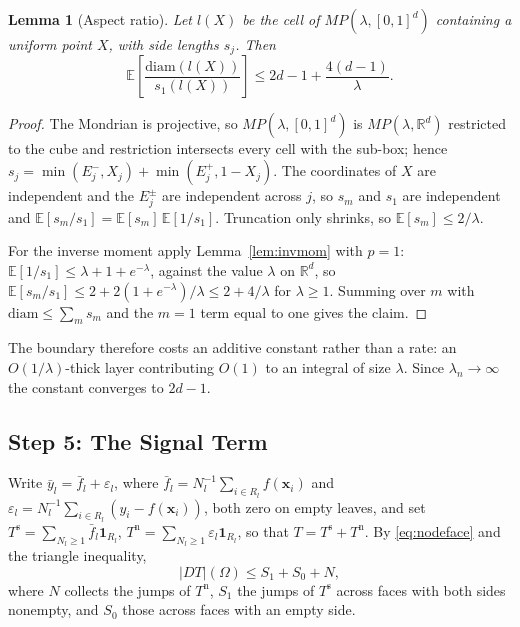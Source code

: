 \documentclass[12pt,a4paper]{article}
\numberwithin{equation}{section}
\theoremstyle{plain}
\newtheorem{lemma}{Lemma}
\theoremstyle{definition}
\newcommand{\R}{\mathbb{R}}
\newcommand{\E}{\mathbb{E}}
\begin{document}
	\begin{lemma}[Aspect ratio]
		\label{lem:aspect}
		Let $l(X)$ be the cell of $MP(\lambda, [0,1]^d)$ containing a uniform
		point $X$, with side lengths $s_j$. Then
		\begin{equation}
			\E\!\left[\frac{\mathrm{diam}(l(X))}{s_1(l(X))}\right]
			\leq 2d - 1 + \frac{4(d-1)}{\lambda}.
		\end{equation}
	\end{lemma}

	\begin{proof}
		The Mondrian is projective, so $MP(\lambda,[0,1]^d)$ is $MP(\lambda,\R^d)$
		restricted to the cube and restriction intersects every cell with the
		sub-box; hence
		$s_j = \min(E_j^-, X_j) + \min(E_j^+, 1 - X_j)$. The coordinates of $X$
		are independent and the $E_j^\pm$ are independent across $j$, so $s_m$
		and $s_1$ are independent and
		$\E[s_m/s_1] = \E[s_m]\,\E[1/s_1]$. Truncation only shrinks, so
		$\E[s_m] \leq 2/\lambda$.

		For the inverse moment apply Lemma~\ref{lem:invmom} with $p = 1$:
		$\E[1/s_1] \leq \lambda + 1 + e^{-\lambda}$, against the value $\lambda$
		on $\R^d$, so
		$\E[s_m/s_1] \leq 2 + 2(1+e^{-\lambda})/\lambda \leq 2 + 4/\lambda$ for
		$\lambda \geq 1$. Summing over $m$ with
		$\mathrm{diam} \leq \sum_m s_m$ and the $m = 1$ term equal to one gives
		the claim.
	\end{proof}

	The boundary therefore costs an additive constant rather than a rate: an
	$O(1/\lambda)$-thick layer contributing $O(1)$ to an integral of size
	$\lambda$. Since $\lambda_n \to \infty$ the constant converges to $2d-1$.

	\subsection{Step 5: The Signal Term}

	Write $\bar{y}_l = \bar{f}_l + \varepsilon_l$, where
	$\bar{f}_l = N_l^{-1}\sum_{i \in R_l} f(\mathbf{x}_i)$ and
	$\varepsilon_l = N_l^{-1}\sum_{i \in R_l}(y_i - f(\mathbf{x}_i))$, both zero
	on empty leaves, and set
	$T^{\mathrm{s}} = \sum_{N_l \geq 1} \bar{f}_l \mathbf{1}_{R_l}$,
	$T^{\mathrm{n}} = \sum_{N_l \geq 1} \varepsilon_l \mathbf{1}_{R_l}$, so that
	$T = T^{\mathrm{s}} + T^{\mathrm{n}}$. By \eqref{eq:nodeface} and the
	triangle inequality,
	\begin{equation}
		|DT|(\Omega) \leq S_1 + S_0 + N ,
	\end{equation}
	where $N$ collects the jumps of $T^{\mathrm{n}}$, $S_1$ the jumps of
	$T^{\mathrm{s}}$ across faces with both sides nonempty, and $S_0$ those
	across faces with an empty side.
\end{document}
